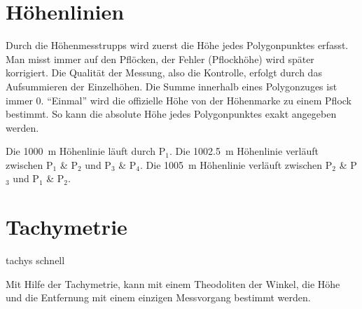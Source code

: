 \section{Höhenlinien}
Durch die Höhenmesstrupps wird zuerst die Höhe jedes Polygonpunktes erfasst.
Man misst immer auf den Pflöcken, der Fehler (Pflockhöhe) wird später korrigiert.
Die Qualität der Messung, also die Kontrolle, erfolgt durch das Aufsummieren der Einzelhöhen.
Die Summe innerhalb eines Polygonzuges ist immer 0.
\enquote{Einmal} wird die offizielle Höhe von der Höhenmarke zu einem Pflock bestimmt.
So kann die absolute Höhe jedes Polygonpunktes exakt angegeben werden.

\begin{center}
\end{center}

Die \SI{1000}{\metre} Höhenlinie läuft durch P$_1$.
Die \SI{1002,5}{\metre} Höhenlinie verläuft zwischen P$_1$ \& P$_2$ und P$_3$ \& P$_4$.
Die \SI{1005}{\metre} Höhenlinie verläuft zwischen P$_2$ \& P$_3$ und P$_1$ \& P$_2$.

\newpage
\section{Tachymetrie}
tachys \entspricht schnell

Mit Hilfe der Tachymetrie, kann mit einem Theodoliten der Winkel, die Höhe und die Entfernung mit einem einzigen
Messvorgang bestimmt werden.

